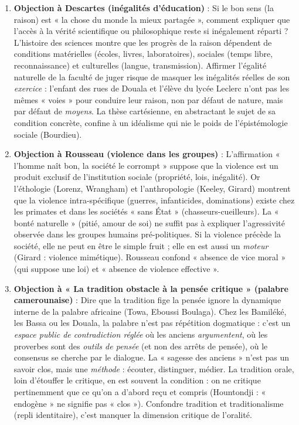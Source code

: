 \documentclass[11pt]{article}
\newcommand{\cle}[1]{{\popxbold\color{popdark}#1}}
\begin{document}
\begin{corrige}
\begin{enumerate}
\item \textbf{Objection à Descartes (inégalités d'éducation)} : \guillemotleft Si le bon sens (la raison) est « la chose du monde la mieux partagée », comment expliquer que l'accès à la vérité scientifique ou philosophique reste si inégalement réparti ? L'histoire des sciences montre que les progrès de la raison dépendent de conditions matérielles (écoles, livres, laboratoires), sociales (temps libre, reconnaissance) et culturelles (langue, transmission). Affirmer l'égalité naturelle de la faculté de juger risque de masquer les inégalités réelles de son \emph{exercice} : l'enfant des rues de Douala et l'élève du lycée Leclerc n'ont pas les mêmes « voies » pour conduire leur raison, non par défaut de nature, mais par défaut de \emph{moyens}. La thèse cartésienne, en abstractant le sujet de sa condition concrète, confine à un idéalisme qui nie le poids de l'épistémologie sociale (Bourdieu). \guillemotright
\item \textbf{Objection à Rousseau (violence dans les groupes)} : \guillemotleft L'affirmation « l'homme naît bon, la société le corrompt » suppose que la violence est un produit exclusif de l'institution sociale (propriété, lois, inégalité). Or l'éthologie (Lorenz, Wrangham) et l'anthropologie (Keeley, Girard) montrent que la violence intra-spécifique (guerres, infanticides, dominations) existe chez les primates et dans les sociétés « sans État » (chasseurs-cueilleurs). La « bonté naturelle » (pitié, amour de soi) ne suffit pas à expliquer l'agressivité observée dans les groupes humains pré-politiques. Si la violence précède la société, elle ne peut en être le simple fruit ; elle en est aussi un \emph{moteur} (Girard : violence mimétique). Rousseau confond « absence de vice moral » (qui suppose une loi) et « absence de violence effective ». \guillemotright
\item \textbf{Objection à « La tradition obstacle à la pensée critique » (palabre camerounaise)} : \guillemotleft Dire que la tradition fige la pensée ignore la dynamique interne de la \cle{palabre} africaine (Towa, Eboussi Boulaga). Chez les Bamiléké, les Bassa ou les Douala, la palabre n'est pas répétition dogmatique : c'est un \emph{espace public de contradiction réglée} où les anciens \emph{argumentent}, où les proverbes sont des \emph{outils de pensée} (et non des arrêts de pensée), où le consensus se cherche par le dialogue. La « sagesse des anciens » n'est pas un savoir clos, mais une \emph{méthode} : écouter, distinguer, médier. La tradition orale, loin d'étouffer le critique, en est souvent la condition : on ne critique pertinemment que ce qu'on a d'abord reçu et compris (Hountondji : « endogène » ne signifie pas « clos »). Confondre tradition et traditionalisme (repli identitaire), c'est manquer la dimension critique de l'oralité. \guillemotright
\end{enumerate}
\end{corrige}
\end{document}
